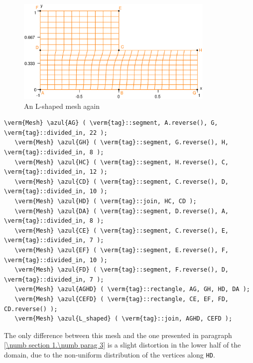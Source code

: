 \begin{figure}[ht] \centering
  \includegraphics[width=95mm]{L-shaped-distorted}
  \caption{An L-shaped mesh again}
  \label{\numb section 2.\numb fig 1}
\end{figure}

\begin{Verbatim}[commandchars=\\\{\},formatcom=\small\tt,frame=single,
   label=main-\ref{\numb section 2.\numb parag 1}.cpp,rulecolor=\color{coment},
   baselinestretch=0.94,framesep=2mm]
   \verm{Mesh} \azul{AG} ( \verm{tag}::segment, A.reverse(), G, \verm{tag}::divided_in, 22 );
   \verm{Mesh} \azul{GH} ( \verm{tag}::segment, G.reverse(), H, \verm{tag}::divided_in, 8 );
   \verm{Mesh} \azul{HC} ( \verm{tag}::segment, H.reverse(), C, \verm{tag}::divided_in, 12 );
   \verm{Mesh} \azul{CD} ( \verm{tag}::segment, C.reverse(), D, \verm{tag}::divided_in, 10 );
   \verm{Mesh} \azul{HD} ( \verm{tag}::join, HC, CD );
   \verm{Mesh} \azul{DA} ( \verm{tag}::segment, D.reverse(), A, \verm{tag}::divided_in, 8 );
   \verm{Mesh} \azul{CE} ( \verm{tag}::segment, C.reverse(), E, \verm{tag}::divided_in, 7 );
   \verm{Mesh} \azul{EF} ( \verm{tag}::segment, E.reverse(), F, \verm{tag}::divided_in, 10 );
   \verm{Mesh} \azul{FD} ( \verm{tag}::segment, F.reverse(), D, \verm{tag}::divided_in, 7 );
   \verm{Mesh} \azul{AGHD} ( \verm{tag}::rectangle, AG, GH, HD, DA );
   \verm{Mesh} \azul{CEFD} ( \verm{tag}::rectangle, CE, EF, FD, CD.reverse() );
   \verm{Mesh} \azul{L_shaped} ( \verm{tag}::join, AGHD, CEFD );
\end{Verbatim}

The only difference between this mesh and the one presented in paragraph
\ref{\numb section 1.\numb parag 3} is a slight distortion in the lower half of the domain,
due to the non-uniform distribution of the vertices along {\small\tt HD}.

